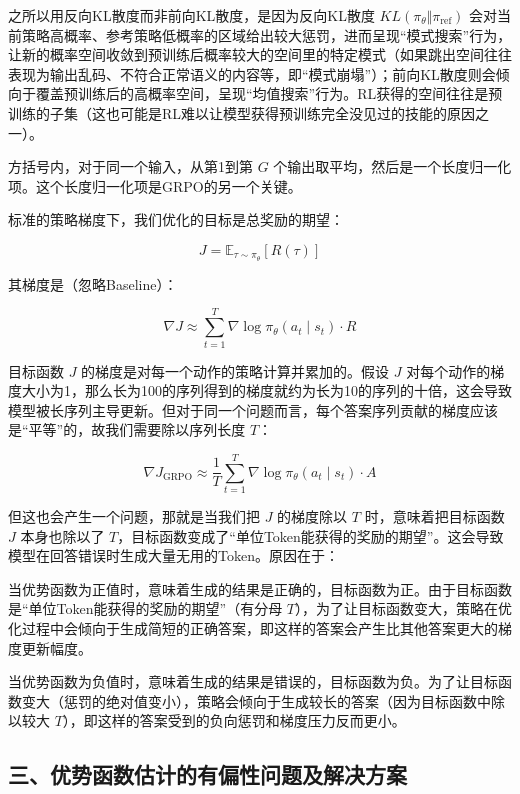 之所以用反向KL散度而非前向KL散度，是因为反向KL散度 \(KL(\pi_{\theta}\Vert\pi_{\mathrm{ref}})\) 会对当前策略高概率、参考策略低概率的区域给出较大惩罚，进而呈现``模式搜索''行为，让新的概率空间收敛到预训练后概率较大的空间里的特定模式（如果跳出空间往往表现为输出乱码、不符合正常语义的内容等，即``模式崩塌''）；前向KL散度则会倾向于覆盖预训练后的高概率空间，呈现``均值搜索''行为。RL获得的空间往往是预训练的子集（这也可能是RL难以让模型获得预训练完全没见过的技能的原因之一）。

方括号内，对于同一个输入，从第1到第 \(G\) 个输出取平均，然后是一个长度归一化项。这个长度归一化项是GRPO的另一个关键。

标准的策略梯度下，我们优化的目标是总奖励的期望：

\[
J=\mathbb{E}_{\tau\sim\pi_{\theta}}[R(\tau)]
\]

其梯度是（忽略Baseline）：

\[
\nabla J\approx \sum_{t=1}^{T}\nabla\log\pi_{\theta}(a_t\mid s_t)\cdot R
\]

目标函数 \(J\) 的梯度是对每一个动作的策略计算并累加的。假设 \(J\) 对每个动作的梯度大小为1，那么长为100的序列得到的梯度就约为长为10的序列的十倍，这会导致模型被长序列主导更新。但对于同一个问题而言，每个答案序列贡献的梯度应该是``平等''的，故我们需要除以序列长度 \(T\)：

\[
\nabla J_{\mathrm{GRPO}}\approx \frac{1}{T}\sum_{t=1}^{T}\nabla\log\pi_{\theta}(a_t\mid s_t)\cdot A
\]

但这也会产生一个问题，那就是当我们把 \(J\) 的梯度除以 \(T\) 时，意味着把目标函数 \(J\) 本身也除以了 \(T\)，目标函数变成了``单位Token能获得的奖励的期望''。这会导致模型在回答错误时生成大量无用的Token。原因在于：

当优势函数为正值时，意味着生成的结果是正确的，目标函数为正。由于目标函数是``单位Token能获得的奖励的期望''（有分母 \(T\)），为了让目标函数变大，策略在优化过程中会倾向于生成简短的正确答案，即这样的答案会产生比其他答案更大的梯度更新幅度。

当优势函数为负值时，意味着生成的结果是错误的，目标函数为负。为了让目标函数变大（惩罚的绝对值变小），策略会倾向于生成较长的答案（因为目标函数中除以较大 \(T\)），即这样的答案受到的负向惩罚和梯度压力反而更小。

\hypertarget{ux4e09ux4f18ux52bfux51fdux6570ux4f30ux8ba1ux7684ux6709ux504fux6027ux95eeux9898ux53caux89e3ux51b3ux65b9ux6848}{%
\subsection{三、优势函数估计的有偏性问题及解决方案}\label{ux4e09ux4f18ux52bfux51fdux6570ux4f30ux8ba1ux7684ux6709ux504fux6027ux95eeux9898ux53caux89e3ux51b3ux65b9ux6848}}

